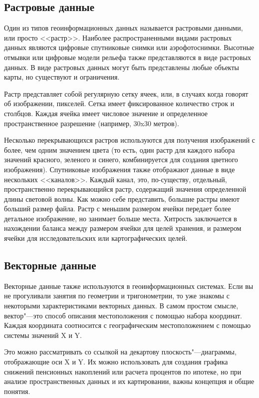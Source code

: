\subsection{Растровые данные}\label{label_rasterdata}

Один из типов геоинформационных данных называется растровыми данными,
или просто <<растр>>. Наиболее распространенными видами растровых данных
являются цифровые спутниковые снимки или аэрофотоснимки. Высотные
отмывки или цифровые модели рельефа также представляются в виде растровых
данных. В виде растровых данных могут быть представлены любые объекты
карты, но существуют и ограничения.

Растр представляет собой регулярную сетку ячеек, или, в случаях когда
говорят об изображении, пикселей. Сетка имеет фиксированное количество
строк и столбцов. Каждая ячейка имеет числовое значение и определенное
пространственное разрешение (например, 30x30 метров).

Несколько перекрывающихся растров используются для получения изображений
с более, чем одним значением цвета (то есть, один растр для каждого
набора значений красного, зеленого и синего, комбинируется для создания
цветного изображения). Спутниковые изображения также отображают данные
в виде нескольких <<каналов>>. Каждый канал, это, по-существу, отдельный,
пространственно перекрывающийся растр, содержащий значения определенной
длины световой волны. Как можно себе представить, большие растры имеют
больший размер файла. Растр с меньшим размером ячейки передает более
детальное изображение, но занимает больше места. Хитрость заключается в
нахождении баланса между размером ячейки для целей хранения, и размером
ячейки для исследовательских или картографических целей.

\subsection{Векторные данные}\label{label_vectordata}

Векторные данные также используются в геоинформационных системах. Если
вы не прогуливали занятия по геометрии и тригонометрии, то уже знакомы
с некоторыми характеристиками векторных данных. В самом простом смысле,
вектор"---это способ описания местоположения с помощью набора координат.
Каждая координата соотносится с географическим местоположением с помощью
системы значений X и Y.

Это можно рассматривать со ссылкой на декартову плоскость"---диаграммы,
отображающие оси X и Y. Их можно использовать для создания графика
снижений пенсионных накоплений или расчета процентов по ипотеке, но при
анализе пространственных данных и их картировании, важны концепция и
общие понятия.

